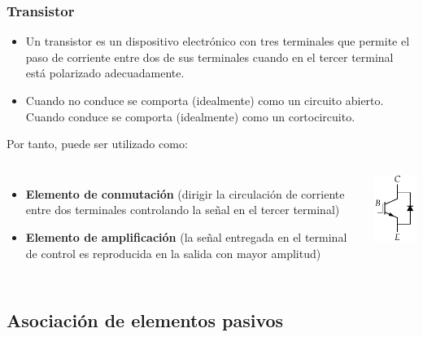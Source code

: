 \documentclass[serif, xcolor=dvipsnames]{beamer}
\begin{document}
\begin{frame}[plain]
  \frametitle{Transistor}
  \begin{itemize}
  \item Un transistor es un dispositivo electrónico con tres
    terminales que permite el paso de corriente entre dos de sus
    terminales cuando en el tercer terminal está polarizado
    adecuadamente.
  \item Cuando no conduce se comporta (idealmente) como un circuito
    abierto.  Cuando conduce se comporta (idealmente) como un
    cortocircuito.
  \end{itemize}
  Por tanto, puede ser utilizado como:
  \begin{columns}%


    \column{8cm}
    \begin{itemize}
    \item \textbf{Elemento de conmutación} (dirigir la circulación de
      corriente entre dos terminales controlando la señal en el tercer
      terminal)
    \item \textbf{Elemento de amplificación} (la señal entregada en el
      terminal de control es reproducida en la salida con mayor
      amplitud)
    \end{itemize}

    \column{3cm}


    \begin{center}
      \includegraphics{../figs/Transistor}
      \par\end{center}

  \end{columns}%

\end{frame}

\subsection{Asociación de elementos pasivos}
\end{document}
